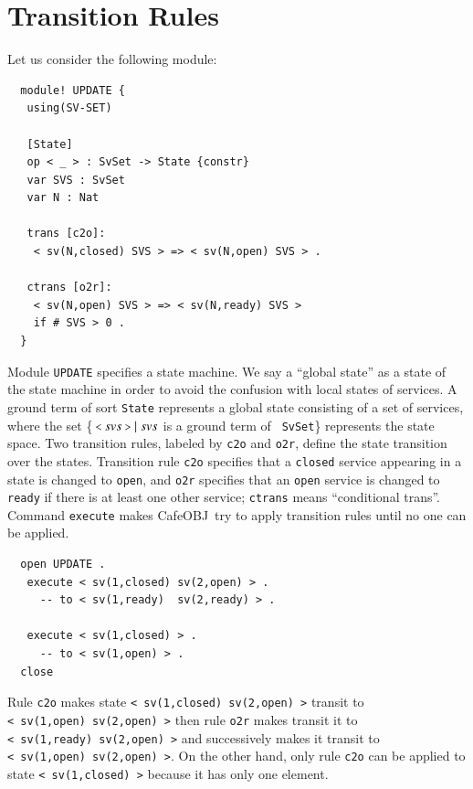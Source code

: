 \documentclass[12pt]{report}
\newcommand{\mbstt}[1]{\mbox{\small{\tt {#1}}}}
\newcommand{\stt}[1]{{\small{\tt {#1}}}}
\newcommand{\cafeobj}{{\sf CafeOBJ}~}
\begin{document}
\section{Transition Rules}
\label{sec:rules}
Let us consider the following module:
\small
\begin{verbatim}
  module! UPDATE {
   using(SV-SET)
  
   [State]
   op < _ > : SvSet -> State {constr}
   var SVS : SvSet    
   var N : Nat
  
   trans [c2o]: 
    < sv(N,closed) SVS > => < sv(N,open) SVS > .
  
   ctrans [o2r]: 
    < sv(N,open) SVS > => < sv(N,ready) SVS >
    if # SVS > 0 . 
  }
\end{verbatim}
\normalsize
Module {\tt UPDATE} specifies a state machine. We say a ``global state''
as a state of the state machine in order to avoid the confusion with
local states of services. A ground term of sort {\tt State} represents
a global state consisting of a set of services, where the set
\{$\ \mbstt{<}\ svs\ \mbstt{>}\mid svs$ is a ground term of {\tt
  SvSet}\} represents the state space. Two transition rules, labeled
by {\tt c2o} and {\tt o2r}, define the state transition over the
states.  Transition rule {\tt c2o} specifies that a {\tt closed}
service appearing in a state is changed to {\tt open}, and {\tt o2r}
specifies that an {\tt open} service is changed to {\tt ready} if
there is at least one other service; {\tt ctrans} means ``conditional
trans''.  Command {\tt execute} makes \cafeobj try to apply transition
rules until no one can be applied.
\small
\begin{verbatim}
  open UPDATE .
   execute < sv(1,closed) sv(2,open) > .
     -- to < sv(1,ready)  sv(2,ready) > .

   execute < sv(1,closed) > .
     -- to < sv(1,open) > .
  close
\end{verbatim}
\normalsize
Rule {\tt c2o} makes state \stt{<~sv(1,closed)~sv(2,open)~>} transit
to \stt{<~sv(1,open)~sv(2,open)~>} then rule {\tt o2r} makes transit
it to \stt{<~sv(1,ready)~sv(2,open)~>} and successively makes it
transit to \stt{<~sv(1,open)~sv(2,open)~>}. On the other hand,
only rule {\tt c2o} can be applied to state \stt{<~sv(1,closed)~>}
because it has only one element.
\end{document}
